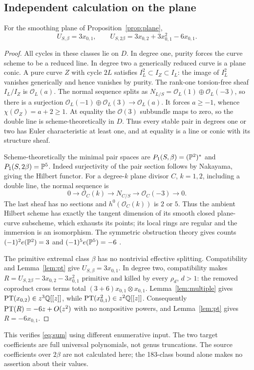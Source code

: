 \subsection{Independent calculation on the plane}
\begin{proposition}\label{prop:target}
For the smoothing plane of Proposition~\ref{prop:plane},
\[
 U_{S,\beta}=3x_{0,1},\qquad
 U_{S,2\beta}=3x_{0,2}+3x_{0,1}^2-6x_{0,1}.
\]
\end{proposition}
\begin{proof}
All cycles in these classes lie on $D$. In degree one, purity
forces the curve scheme to be a reduced line. In degree two a
generically reduced curve is a plane conic. A pure curve $Z$ with
cycle $2L$ satisfies $I_L^2\subset I_Z\subset I_L$: the image of
$I_L^2$ vanishes generically and hence vanishes by purity.
The rank-one torsion-free sheaf $I_L/I_Z$ is $\mathcal O_L(a)$.
The normal sequence splits as
$N_{L/S}=\mathcal O_L(1)\oplus\mathcal O_L(-3)$, so there is a
surjection $\mathcal O_L(-1)\oplus\mathcal O_L(3)\to\mathcal O_L(a)$.
It forces $a\ge-1$, whence $\chi(\mathcal O_Z)=a+2\ge1$.
At equality the $\mathcal O(3)$ subbundle maps to zero, so the
double line is scheme-theoretically in $D$. Thus every stable pair
in degrees one or two has Euler characteristic at least one, and
at equality is a line or conic with its structure sheaf.

Scheme-theoretically the minimal pair spaces are
$P_1(S,\beta)=(\mathbb P^2)^*$ and $P_1(S,2\beta)=\mathbb P^5$.
Indeed surjectivity of the pair section follows by Nakayama, giving
the Hilbert functor. For a degree-$k$ plane divisor $C$, $k=1,2$,
including a double line, the normal sequence is
\[
 0\to\mathcal O_C(k)\to N_{C/S}\to\mathcal O_C(-3)\to0.
\]
The last sheaf has no sections and $h^0(\mathcal O_C(k))$ is $2$
or $5$. Thus the ambient Hilbert scheme has exactly the tangent
dimension of its smooth closed plane-curve subscheme, which exhausts
its points; its local rings are regular and the immersion is an
isomorphism. The symmetric obstruction theory gives counts
$(-1)^2e(\mathbb P^2)=3$ and $(-1)^5e(\mathbb P^5)=-6$
\cite[p.~3]{PT}.

The primitive extremal class $\beta$ has no nontrivial effective
splitting. Compatibility and Lemma~\ref{lem:pt} give
$U_{S,\beta}=3x_{0,1}$. In degree two, compatibility makes
$R=U_{S,2\beta}-3x_{0,2}-3x_{0,1}^2$ primitive and killed by
every $\rho_d$, $d>1$: the removed coproduct cross terms total
$(3+6)x_{0,1}\otimes x_{0,1}$. Lemma~\ref{lem:multiple} gives
$\operatorname{PT}(x_{0,2})\in z^3\mathbb Q[[z]]$, while
$\operatorname{PT}(x_{0,1}^2)\in z^2\mathbb Q[[z]]$. Consequently
$\operatorname{PT}(R)=-6z+O(z^2)$ with no nonpositive powers, and
Lemma~\ref{lem:pt} gives $R=-6x_{0,1}$.
\end{proof}

This verifies \eqref{eq:sum} using different enumerative input. The
two target coefficients are full universal polynomials, not genus
truncations. The source coefficients over $2\beta$ are not calculated
here; the 183-class bound alone makes no assertion about their values.
